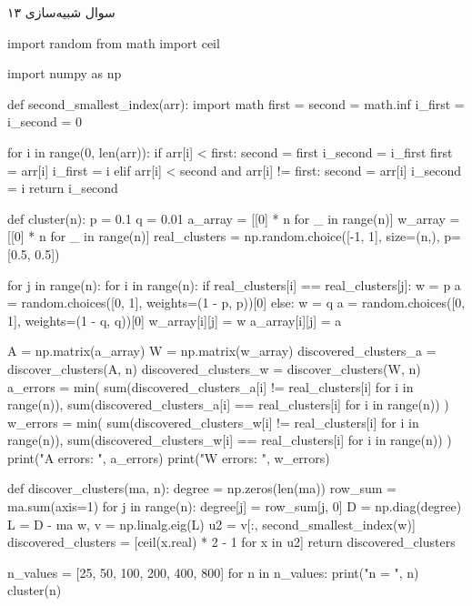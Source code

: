سوال شبیه‌سازی ۱۳

\begin{latin}
\begin{python}
import random
from math import ceil

import numpy as np


def second_smallest_index(arr):
    import math
    first = second = math.inf
    i_first = i_second = 0

    for i in range(0, len(arr)):
        if arr[i] < first:
            second = first
            i_second = i_first
            first = arr[i]
            i_first = i
        elif arr[i] < second and arr[i] != first:
            second = arr[i]
            i_second = i
    return i_second


def cluster(n):
    p = 0.1
    q = 0.01
    a_array = [[0] * n for _ in range(n)]
    w_array = [[0] * n for _ in range(n)]
    real_clusters = np.random.choice([-1, 1], size=(n,),
    p=[0.5, 0.5])

    for j in range(n):
        for i in range(n):
            if real_clusters[i] == real_clusters[j]:
                w = p
                a = random.choices([0, 1], weights=(1 - p, p))[0]
            else:
                w = q
                a = random.choices([0, 1], weights=(1 - q, q))[0]
            w_array[i][j] = w
            a_array[i][j] = a

    A = np.matrix(a_array)
    W = np.matrix(w_array)
    discovered_clusters_a = discover_clusters(A, n)
    discovered_clusters_w = discover_clusters(W, n)
    a_errors = min(
        sum(discovered_clusters_a[i] != real_clusters[i] 
        for i in range(n)),
        sum(discovered_clusters_a[i] == real_clusters[i] 
        for i in range(n))
    )
    w_errors = min(
        sum(discovered_clusters_w[i] != real_clusters[i] 
        for i in range(n)),
        sum(discovered_clusters_w[i] == real_clusters[i] 
        for i in range(n))
    )
    print("A errors: ", a_errors)
    print("W errors: ", w_errors)


def discover_clusters(ma, n):
    degree = np.zeros(len(ma))
    row_sum = ma.sum(axis=1)
    for j in range(n):
        degree[j] = row_sum[j, 0]
    D = np.diag(degree)
    L = D - ma
    w, v = np.linalg.eig(L)
    u2 = v[:, second_smallest_index(w)]
    discovered_clusters = [ceil(x.real) * 2 - 1 for x in u2]
    return discovered_clusters


n_values = [25, 50, 100, 200, 400, 800]
for n in n_values:
    print("n = ", n)
    cluster(n)
\end{python}
\end{latin}